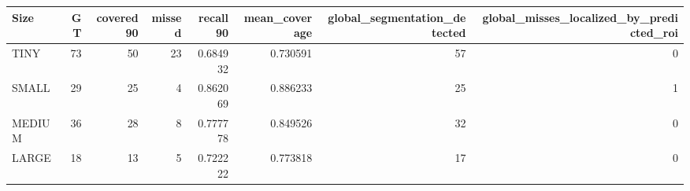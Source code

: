 \begin{tabular}{lrrrrrrr}
\toprule
Size & GT & covered90 & missed & recall90 & mean_coverage & global_segmentation_detected & global_misses_localized_by_predicted_roi \\
\midrule
TINY & 73 & 50 & 23 & 0.684932 & 0.730591 & 57 & 0 \\
SMALL & 29 & 25 & 4 & 0.862069 & 0.886233 & 25 & 1 \\
MEDIUM & 36 & 28 & 8 & 0.777778 & 0.849526 & 32 & 0 \\
LARGE & 18 & 13 & 5 & 0.722222 & 0.773818 & 17 & 0 \\
\bottomrule
\end{tabular}
